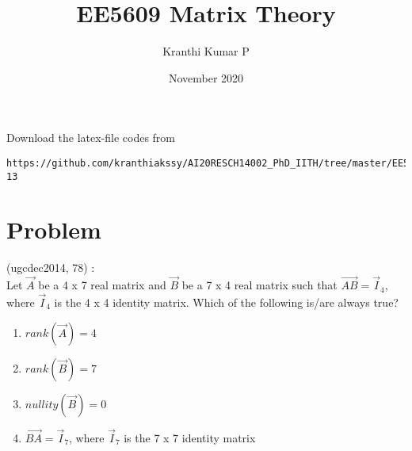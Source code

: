 \documentclass[journal,12pt]{IEEEtran}
\begin{document}
     \def\rightbox#1{\makebox[0in][r]{#1}}
     \def\centbox#1{\makebox[0in]{#1}}
     \def\topbox#1{\raisebox{-\baselineskip}[0in][0in]{#1}}
     \def\midbox#1{\raisebox{-0.5\baselineskip}[0in][0in]{#1}}
\vspace{3cm}
\title{EE5609 Matrix Theory}
\author{Kranthi Kumar P}
\date{November 2020}
\maketitle
\bigskip
\renewcommand{\thefigure}{\theenumi}
\renewcommand{\thetable}{\theenumi}

Download the latex-file codes from 
\begin{lstlisting}
https://github.com/kranthiakssy/AI20RESCH14002_PhD_IITH/tree/master/EE5609_Matrix_Theory/Assignment-13
\end{lstlisting}
\section{\textbf{Problem}}
(ugcdec2014, 78) : \\
Let $\vec{A}$ be a 4 x 7 real matrix and $\vec{B}$ be a 7 x 4 real matrix such that $\vec{AB} = \vec{I}_4$, where $\vec{I}_4$ is the 4 x 4 identity matrix. Which of the following is/are always true?
\begin{enumerate} %
\item $rank(\vec{A}) = 4 $
\item $rank(\vec{B}) = 7 $
\item $nullity(\vec{B}) = 0 $
\item $\vec{BA} = \vec{I}_7 $, where $\vec{I}_7$ is the 7 x 7 identity matrix
\end{enumerate}
\end{document}
